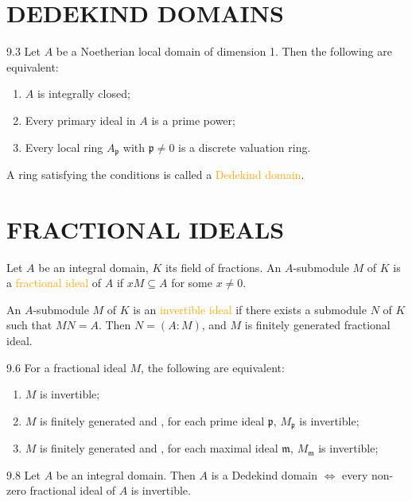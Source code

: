 \section*{DEDEKIND DOMAINS}

\begin{theorem}{9.3}
	Let $A$ be a Noetherian local domain of dimension 1. Then the following are equivalent:
	\begin{enumerate}[label=\textup{(\roman*)},ref=\thetheoremtemp(\roman*)]
		\item\label{9.3.1} $A$ is integrally closed;
		\item\label{9.3.2} Every primary ideal in $A$ is a prime power;
		\item\label{9.3.3} Every local ring $A_\mathfrak{p}$ with $\mathfrak{p}\neq0$ is a discrete valuation ring.
	\end{enumerate}
	A ring satisfying the conditions is called a \textcolor{orange}{Dedekind domain}.
\end{theorem}

\section*{FRACTIONAL IDEALS}

Let $A$ be an integral domain, $K$ its field of fractions. An $A$-submodule $M$ of $K$ is a \textcolor{orange}{fractional ideal} of $A$ if $xM\subseteq A$ for some $x\neq0$.

An $A$-submodule $M$ of $K$ is an \textcolor{orange}{invertible ideal} if there exists a submodule $N$ of $K$ such that $MN=A$. Then $N=(A:M)$, and $M$ is finitely generated fractional ideal.

\begin{proposition}{9.6}
	For a fractional ideal $M$, the following are equivalent:
	\begin{enumerate}[label=\textup{(\roman*)}]
		\item $M$ is invertible;
		\item $M$ is finitely generated and , for each prime ideal $\mathfrak{p}$, $M_\mathfrak{p}$ is invertible;
		\item $M$ is finitely generated and , for each maximal ideal $\mathfrak{m}$, $M_\mathfrak{m}$ is invertible;
	\end{enumerate}
\end{proposition}

\begin{theorem}{9.8}
	Let $A$ be an integral domain. Then $A$ is a Dedekind domain $\Leftrightarrow$ every non-zero fractional ideal of $A$ is invertible.
\end{theorem}
